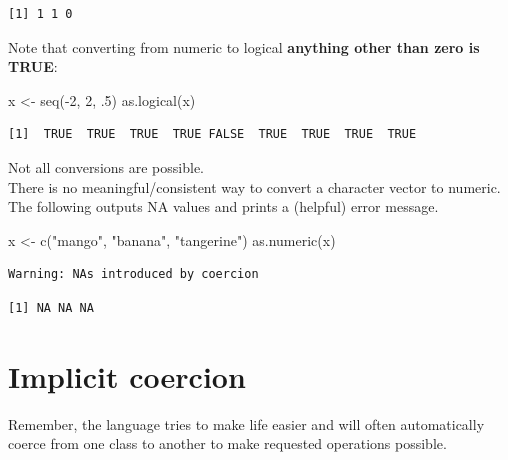 \documentclass[
]{book}
\newenvironment{Shaded}{\begin{snugshade}}{\end{snugshade}}
\newcommand{\DecValTok}[1]{\textcolor[rgb]{0.00,0.00,0.81}{#1}}
\newcommand{\FunctionTok}[1]{\textcolor[rgb]{0.00,0.00,0.00}{#1}}
\newcommand{\NormalTok}[1]{#1}
\newcommand{\OtherTok}[1]{\textcolor[rgb]{0.56,0.35,0.01}{#1}}
\newcommand{\SpecialCharTok}[1]{\textcolor[rgb]{0.00,0.00,0.00}{#1}}
\newcommand{\StringTok}[1]{\textcolor[rgb]{0.31,0.60,0.02}{#1}}
\begin{document}
\begin{verbatim}
[1] 1 1 0
\end{verbatim}

Note that converting from numeric to logical \textbf{anything other than zero is TRUE}:

\begin{Shaded}
\begin{Highlighting}[]
\NormalTok{x }\OtherTok{\textless{}{-}} \FunctionTok{seq}\NormalTok{(}\SpecialCharTok{{-}}\DecValTok{2}\NormalTok{, }\DecValTok{2}\NormalTok{, .}\DecValTok{5}\NormalTok{)}
\FunctionTok{as.logical}\NormalTok{(x)}
\end{Highlighting}
\end{Shaded}

\begin{verbatim}
[1]  TRUE  TRUE  TRUE  TRUE FALSE  TRUE  TRUE  TRUE  TRUE
\end{verbatim}

Not all conversions are possible.\\
There is no meaningful/consistent way to convert a character vector to numeric.\\
The following outputs NA values and prints a (helpful) error message.

\begin{Shaded}
\begin{Highlighting}[]
\NormalTok{x }\OtherTok{\textless{}{-}} \FunctionTok{c}\NormalTok{(}\StringTok{"mango"}\NormalTok{, }\StringTok{"banana"}\NormalTok{, }\StringTok{"tangerine"}\NormalTok{)}
\FunctionTok{as.numeric}\NormalTok{(x)}
\end{Highlighting}
\end{Shaded}

\begin{verbatim}
Warning: NAs introduced by coercion
\end{verbatim}

\begin{verbatim}
[1] NA NA NA
\end{verbatim}

\hypertarget{implicit-coercion}{%
\section{Implicit coercion}\label{implicit-coercion}}

Remember, the language tries to make life easier and will often automatically coerce from one class to another to make requested operations possible.
\end{document}
